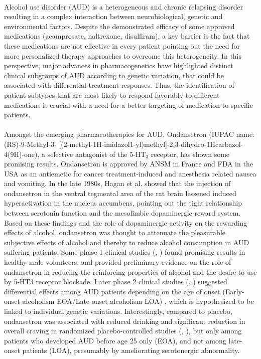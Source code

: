 \paragraph{}
Alcohol use disorder (AUD) is a heterogeneous and chronic relapsing disorder resulting in a complex interaction between neurobiological, genetic and environmental factors. Despite the demonstrated efficacy of some approved medications (acamprosate, naltrexone, disulfiram), a key barrier is the fact that these medications are not effective in every patient pointing out the need for more personalized therapy approaches to overcome this heterogeneity. In this perspective, major advances in pharmacogenetics have highlighted distinct clinical subgroups of AUD according to genetic variation, that could be associated with differential treatment responses. Thus, the identification of patient subtypes that are most likely to respond favorably to different medications is crucial with a need for a better targeting of medication to specific patients.

\paragraph{}
Amongst the emerging pharmacotherapies for AUD, Ondansetron (IUPAC name: (RS)-9-Methyl-3- [(2-methyl-1H-imidazol1-yl)methyl]-2,3-dihydro-1Hcarbazol-4(9H)-one), a selective antagonist of the $\text{5-HT}_3$ receptor, has shown some promising results. Ondansetron is approved by ANSM in France and FDA in the USA as an antiemetic for cancer treatment-induced and anesthesia related nausea and vomiting. 
In the late 1980s, Hagan et al. \cite{hagan_effect_1987} showed that the injection of ondansetron in the ventral tegmental area of the rat brain lessened induced hyperactivation in the nucleus accumbens, pointing out the tight relationship between serotonin function and the mesolimbic dopaminergic reward system. Based on these findings and the role of dopaminergic activity on the rewarding effects of alcohol, ondansetron was thought to attenuate the pleasurable subjective effects of alcohol and thereby to reduce alcohol consumption in AUD suffering patients. Some phase 1 clinical studies (\cite{grant_blockade_1991}, \cite{johnson_attenuation_1993}) found promising results in healthy male volunteers, and provided preliminary evidence on the role of ondansetron in reducing the reinforcing properties of alcohol and the desire to use by 5-HT3 receptor blockade. 
Later phase 2 clinical studies (\cite{johnson_ondansetron_2000}, \cite{kranzler_effects_2003}) suggested differential effects among AUD patients depending on the age of onset (Early-onset alcoholism EOA/Late-onset alcoholism LOA) \cite{varma1994correlates}, which is hypothesized to be linked to individual genetic variations. Interestingly, compared to placebo, ondansetron was associated with reduced drinking and significant reduction in overall craving in randomized placebo-controlled studies (\cite{johnson_ondansetron_2000}, \cite{johnson_ondansetron_2002}), but only among patients who developed AUD before age 25 only (EOA), and not among late-onset patients (LOA), presumably by ameliorating serotonergic abnormality.

